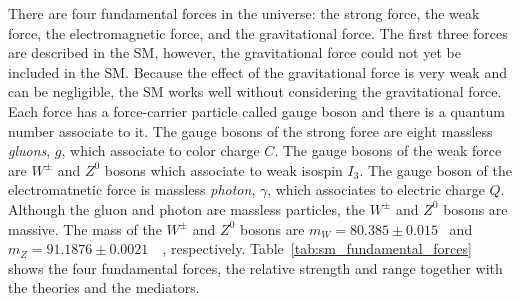 
There are four fundamental forces in the universe: the strong force, the weak force, the electromagnetic force, and the gravitational force.
The first three forces are described in the SM, however, the gravitational force could not yet be included in the SM.
Because the effect of the gravitational force is very weak and can be negligible, the SM works well without considering the gravitational force.
Each force has a force-carrier particle called gauge boson and there is a quantum number associate to it.
The gauge bosons of the strong force are eight massless \textit{gluons}, $g$, which associate to color charge $C$.
The gauge bosons of the weak force are $W^{\pm}$ and $Z^{0}$ bosons which associate to weak isospin $I_{3}$.
The gauge boson of the electromatnetic force is massless \textit{photon}, $\gamma$, which associates to electric charge $Q$.
Although the gluon and photon are massless particles, the $W^{\pm}$ and $Z^{0}$ bosons are massive.
The mass of the $W^{\pm}$ and $Z^{0}$ bosons are $m_{W}=80.385 \pm 0.015$~{\GeV} and $m_{Z}=91.1876 \pm 0.0021$~{\GeV}~\cite{PDG}, respectively.
Table~\ref{tab:sm_fundamental_forces} shows the four fundamental forces, the relative strength and range together with the theories and the mediators.

\begin{table}[htp]
\caption{The four fundamental forces with the relative strength, interaction range, describing theory, and the mediator with its mass.
The gravitational force is not a part of the SM and the graviton is a theoretical particle.}
\label{tab:sm_fundamental_forces}
\end{table}%

